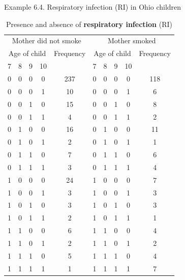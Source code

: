 \documentclass{beamer}
\begin{document}

\begin{frame}{Example 6.4. Respiratory infection (RI) in Ohio children }
\begin{table} [!htbp]
\caption{Presence and absence of {\bf respiratory infection} (RI) \label{tab1.4}}
\begin{center}
\begin{scriptsize}
\begin{tabular}{|ccccc|ccccc|}
\hline
\multicolumn{5}{|c|}{Mother did not smoke} & \multicolumn{5}{c|}{Mother smoked}  \\
\multicolumn{4}{|c}{Age of child} & Frequency & \multicolumn{4}{c}{Age of child} & Frequency \\
7 & 8 & 9 & 10 & & 7 & 8 & 9 & 10 & \\ \hline
0 & 0 & 0 & 0& 237 & 0 & 0 & 0 & 0& 118 \\
0 & 0 & 0 & 1 & 10 & 0 & 0 & 0 & 1& 6 \\
0 & 0 & 1 & 0& 15 & 0 & 0 & 1 & 0& 8 \\
0 & 0 & 1 & 1& 4 & 0 & 0 & 1 & 1 & 2 \\ \hline
0 & 1 & 0 & 0& 16 & 0 & 1 & 0 & 0& 11 \\
0 & 1 & 0 & 1 & 2 & 0 & 1 & 0 & 1& 1 \\
0 & 1 & 1 & 0& 7 & 0 & 1 & 1 & 0& 6 \\
0 & 1 & 1 & 1& 3 & 0 & 1 & 1 & 1 & 4 \\ \hline
1& 0 & 0 & 0& 24 & 1 & 0 & 0 & 0& 7 \\
1 & 0 & 0 & 1 & 3 & 1 & 0 & 0 & 1& 3 \\
1 & 0 & 1 & 0& 3 & 1 & 0 & 1 & 0& 3 \\
1 & 0 & 1 & 1& 2 & 1 & 0 & 1 & 1 & 1 \\ \hline
1 & 1 & 0 & 0& 6 & 1 & 1 & 0 & 0& 4 \\
1 & 1 & 0 & 1 & 2 & 1 & 1 & 0 & 1& 2 \\
1 & 1 & 1 & 0& 5 &  1 & 1 & 1 & 0& 4 \\
1 & 1 & 1 & 1& 1 & 1 & 1 & 1 & 1 & 7 \\ \hline
\end{tabular}
\end{scriptsize}
\end{center}
\end{table}
\end{frame}
\end{document}

